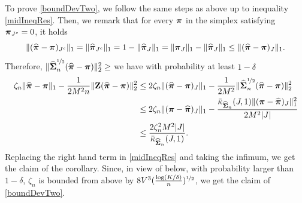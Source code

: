 To prove \eqref{boundDevTwo}, we follow the same steps as above up to inequality \eqref{midIneqRes}.
Then, we remark that for every $\boldsymbol \pi$ in the simplex satisfying $\boldsymbol \pi_{J^c}=0$, it holds
\begin{equation}\label{inqCone}
\|(\widehat{\boldsymbol \pi}-\boldsymbol \pi)_{J^c}\|_1= \|\widehat{\boldsymbol \pi}_{J^c}\|_1 = 1-\|\widehat{\boldsymbol \pi}_{J}\|_1 =
\|\boldsymbol \pi_{J}\|_1-\|\widehat{\boldsymbol \pi}_{J}\|_1\le \|(\widehat{\boldsymbol \pi}-\boldsymbol \pi)_{J}\|_1.
\end{equation}
Therefore, $\|\widehat{\boldsymbol\Sigma}_n^{\nicefrac12}(\widehat{\boldsymbol \pi}-\boldsymbol \pi)\|_2^2\ge $ we have with probability at least $1-\delta$
\begin{align}
\zeta_n\| \widehat{\boldsymbol \pi} - \boldsymbol \pi\|_1 -\frac{1}{2M^2n}\|\mathbf Z(\widehat{\boldsymbol \pi}-\boldsymbol \pi)\|_2^2
&\leq 2\zeta_n\| (\widehat{\boldsymbol \pi}-\boldsymbol \pi)_J\|_1-\frac{1}{2M^2}\|\widehat{\boldsymbol\Sigma}_n^{\nicefrac12}(\widehat{\boldsymbol \pi}-\boldsymbol \pi)\|_2^2\nonumber\\
&\leq 2\zeta_n\| (\boldsymbol \pi-\widehat{\boldsymbol \pi})_J\|_1 - \frac{\bar\kappa_{\widehat{\boldsymbol\Sigma}_n}(J,1)\| (\boldsymbol \pi-\widehat{\boldsymbol \pi})_J\|_1^2}{2M^2|J|}\nonumber\\
&\leq \frac{2\zeta_n^2M^2|J|}{\bar\kappa_{\widehat{\boldsymbol\Sigma}_n}(J,1)}.\label{ineqa}
\end{align}
Replacing the right hand term in \eqref{midIneqRes} and taking the infimum, we get
the claim of the corollary. Since, in view of  below, with probability
larger than $1-\delta$, $\zeta_n$ is bounded from above by
$8V^3(\frac{\log(K/\delta)}{n})^{\nicefrac12}$, we get the claim of \eqref{boundDevTwo}.


